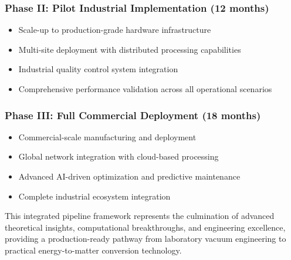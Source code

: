 \documentclass[11pt]{article}
\begin{document}
\subsubsection*{Phase II: Pilot Industrial Implementation (12 months)}
\begin{itemize}
\item Scale-up to production-grade hardware infrastructure
\item Multi-site deployment with distributed processing capabilities
\item Industrial quality control system integration
\item Comprehensive performance validation across all operational scenarios
\end{itemize}

\subsubsection*{Phase III: Full Commercial Deployment (18 months)}
\begin{itemize}
\item Commercial-scale manufacturing and deployment
\item Global network integration with cloud-based processing
\item Advanced AI-driven optimization and predictive maintenance
\item Complete industrial ecosystem integration
\end{itemize}

This integrated pipeline framework represents the culmination of advanced theoretical insights, computational breakthroughs, and engineering excellence, providing a production-ready pathway from laboratory vacuum engineering to practical energy-to-matter conversion technology.
\end{document}
